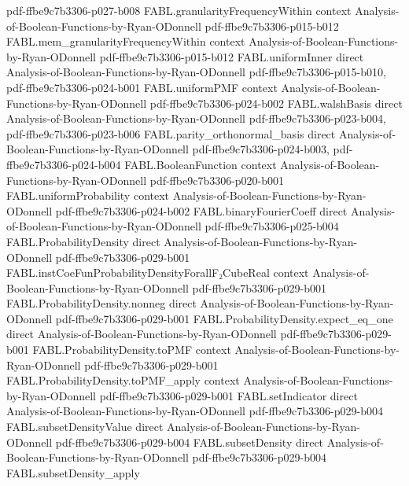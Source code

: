 \begin{theorem}
  {pdf-ffbe9c7b3306-p027-b008}
\proofstep
  {FABL.granularityFrequencyWithin}
  {context}
  {Analysis-of-Boolean-Functions-by-Ryan-ODonnell}
  {pdf-ffbe9c7b3306-p015-b012}
\proofstep
  {FABL.mem_granularityFrequencyWithin}
  {context}
  {Analysis-of-Boolean-Functions-by-Ryan-ODonnell}
  {pdf-ffbe9c7b3306-p015-b012}
\proofstep
  {FABL.uniformInner}
  {direct}
  {Analysis-of-Boolean-Functions-by-Ryan-ODonnell}
  {pdf-ffbe9c7b3306-p015-b010,
    pdf-ffbe9c7b3306-p024-b001}
\proofstep
  {FABL.uniformPMF}
  {context}
  {Analysis-of-Boolean-Functions-by-Ryan-ODonnell}
  {pdf-ffbe9c7b3306-p024-b002}
\proofstep
  {FABL.walshBasis}
  {direct}
  {Analysis-of-Boolean-Functions-by-Ryan-ODonnell}
  {pdf-ffbe9c7b3306-p023-b004,
    pdf-ffbe9c7b3306-p023-b006}
\proofstep
  {FABL.parity_orthonormal_basis}
  {direct}
  {Analysis-of-Boolean-Functions-by-Ryan-ODonnell}
  {pdf-ffbe9c7b3306-p024-b003,
    pdf-ffbe9c7b3306-p024-b004}
\proofstep
  {FABL.BooleanFunction}
  {context}
  {Analysis-of-Boolean-Functions-by-Ryan-ODonnell}
  {pdf-ffbe9c7b3306-p020-b001}
\proofstep
  {FABL.uniformProbability}
  {context}
  {Analysis-of-Boolean-Functions-by-Ryan-ODonnell}
  {pdf-ffbe9c7b3306-p024-b002}
\proofstep
  {FABL.binaryFourierCoeff}
  {direct}
  {Analysis-of-Boolean-Functions-by-Ryan-ODonnell}
  {pdf-ffbe9c7b3306-p025-b004}
\proofstep
  {FABL.ProbabilityDensity}
  {direct}
  {Analysis-of-Boolean-Functions-by-Ryan-ODonnell}
  {pdf-ffbe9c7b3306-p029-b001}
\proofstep
  {FABL.instCoeFunProbabilityDensityForallF₂CubeReal}
  {context}
  {Analysis-of-Boolean-Functions-by-Ryan-ODonnell}
  {pdf-ffbe9c7b3306-p029-b001}
\proofstep
  {FABL.ProbabilityDensity.nonneg}
  {direct}
  {Analysis-of-Boolean-Functions-by-Ryan-ODonnell}
  {pdf-ffbe9c7b3306-p029-b001}
\proofstep
  {FABL.ProbabilityDensity.expect_eq_one}
  {direct}
  {Analysis-of-Boolean-Functions-by-Ryan-ODonnell}
  {pdf-ffbe9c7b3306-p029-b001}
\proofstep
  {FABL.ProbabilityDensity.toPMF}
  {context}
  {Analysis-of-Boolean-Functions-by-Ryan-ODonnell}
  {pdf-ffbe9c7b3306-p029-b001}
\proofstep
  {FABL.ProbabilityDensity.toPMF_apply}
  {context}
  {Analysis-of-Boolean-Functions-by-Ryan-ODonnell}
  {pdf-ffbe9c7b3306-p029-b001}
\proofstep
  {FABL.setIndicator}
  {direct}
  {Analysis-of-Boolean-Functions-by-Ryan-ODonnell}
  {pdf-ffbe9c7b3306-p029-b004}
\proofstep
  {FABL.subsetDensityValue}
  {direct}
  {Analysis-of-Boolean-Functions-by-Ryan-ODonnell}
  {pdf-ffbe9c7b3306-p029-b004}
\proofstep
  {FABL.subsetDensity}
  {direct}
  {Analysis-of-Boolean-Functions-by-Ryan-ODonnell}
  {pdf-ffbe9c7b3306-p029-b004}
\proofstep
  {FABL.subsetDensity_apply}

\end{theorem}
